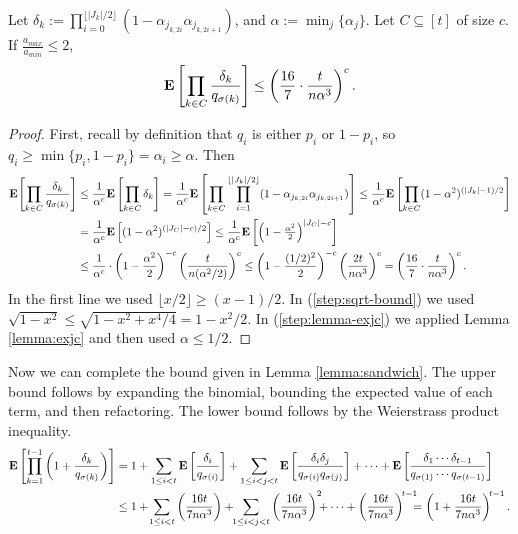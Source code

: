 \begin{lemma}\label{lemma:exprod}
Let $\delta_k:=\prod_{i=0}^{\lfloor |J_k|/2\rfloor}(1-\alpha_{j_{k,2i}}\alpha_{j_{k,2i+1}})$, and $\alpha:=\min_j\{\alpha_j\}$. Let $C\subseteq[t]$ of size $c$. If $\frac{a_{max}}{a_{min}}\le2$, 
\[ \text{\bf E}\left[ \prod_{k\in C} \frac{\delta_k}{q_{\sigma(k)}} \right] 
\le \left(\frac{16}{7}\cdot\frac{t}{n\alpha^3}\right)^c . \]
\end{lemma}

\begin{proof} First, recall by definition that $q_i$ is either $p_i$ or $1-p_i$, so $q_i\ge \min\{p_i,1-p_i\} =\alpha_i\ge \alpha$. Then
\begin{align} 
\text{\bf E}\hspace{-1pt}\left[ \prod_{k\in C} \frac{\delta_k}{q_{\sigma(k)}} \right] 
&\le \frac{1}{\alpha^c}\text{\bf E}\left[ \prod_{k\in C} \delta_k \right] 
=\frac{1}{\alpha^c} \text{\bf E}\left[ \prod_{k\in C} \prod_{i=1}^{\lfloor |J_k|/2\rfloor}(1-\alpha_{j_{k,2i}}\alpha_{j_{k,2i+1}})\right] 
\le \frac{1}{\alpha^c}\text{\bf E}\left[ \prod_{k\in C} (1-\alpha^2)^{(|J_k|-1)/2}\right] \label{eq:am-gm}
\\&= \frac{1}{\alpha^c}\text{\bf E}\left[(1-\alpha^2)^{(|J_C|-c)/2}\right]
\le \frac{1}{\alpha^c}\text{\bf E}\left[\left(1-{\textstyle\frac{\alpha^2}{2}}\right)^{|J_C|-c}\right] \label{step:sqrt-bound}
\\&\le \frac{1}{\alpha^c}\cdot \left(1-\frac{\alpha^2}{2}\right)^{-c}\left(\frac{t}{n(\alpha^2/2)}\right)^c
\le \left(1-\frac{(1/2)^2}{2}\right)^{-c} \left(\frac{2t}{n\alpha^3}\right)^c
=\left(\frac{16}{7}\cdot\frac{t}{n\alpha^3}\right)^c . \label{step:lemma-exjc}
\end{align}
In the first line we used $\lfloor x/2\rfloor\ge (x-1)/2$. In (\ref{step:sqrt-bound}) we used $\sqrt{1-x^2}\le\sqrt{1-x^2+x^4/4}=1-x^2/2$. In (\ref{step:lemma-exjc}) we applied Lemma \ref{lemma:exjc} and then used $\alpha\le1/2$.
\end{proof}
Now we can complete the bound given in Lemma \ref{lemma:sandwich}. The upper bound follows by expanding the binomial, bounding the expected value of each term, and then refactoring. The lower bound follows by the Weierstrass product inequality.
\begin{align}
\E\left[\prod_{k=1}^{t-1} \left(1 + \frac{\delta_k}{q_{\sigma(k)}}\right)\right] 
 &=1+\sum_{1\le i<t}\E\left[\frac{\delta_i}{q_{\sigma(i)}}\right]
	+\sum_{1\le i<j<t}\E\left[\frac{\delta_i\delta_j}{q_{\sigma(i)}q_{\sigma(j)}}\right]
	+\cdots+\E\left[\frac{\delta_1\cdots \delta_{t-1}}{q_{\sigma(1)}\cdots q_{\sigma(t-1)}}\right]
\nonumber\\ &\le1+\!\sum_{1\le i<t}\left(\frac{16t}{7 n\alpha^3}\right)
	+\!\!\sum_{1\le i<j<t} \left(\frac{16t}{7 n\alpha^3}\right)^2 
	\!\!\!+\cdots+\left(\frac{16t}{7 n\alpha^3}\right)^{\!t-1}
\!\!\!\!= \left(1+\frac{16t}{7 n\alpha^3}\right)^{\!t-1}.
\label{eq:exp-up}\end{align}
